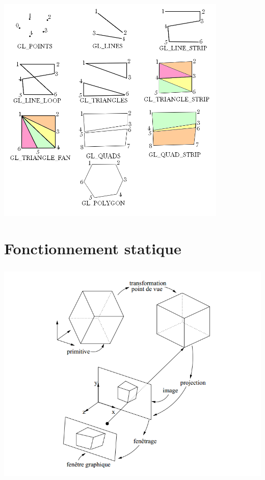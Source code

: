  \begin{center}
	 \includegraphics[height=11cm]{img/Primitives}
 \end{center}
\newpage

\section{Fonctionnement statique}
\begin{center}
	 \includegraphics[height=11cm]{img/Fonctionnement}
 \end{center}

